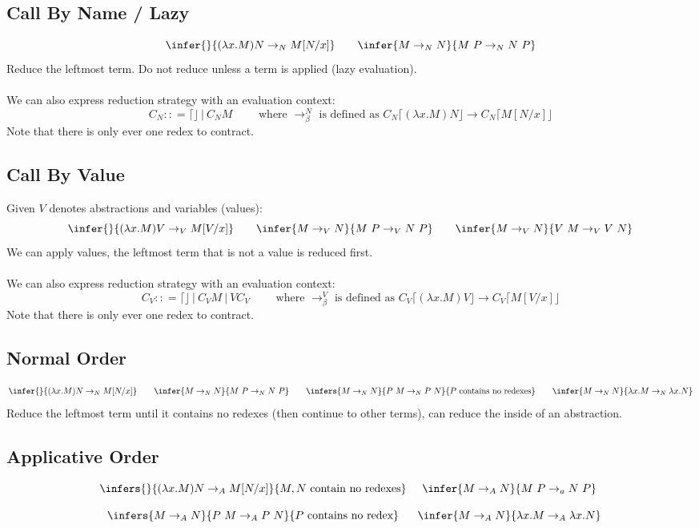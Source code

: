 \subsection{Call By Name / Lazy}
\[\infer{}{(\lambda x . M) N \to_N M[N / x]} \qquad \infer{M \to_N N}{M \ P \to_N N \ P}\]
Reduce the leftmost term. Do not reduce unless a term is applied (lazy evaluation).
\\
\\ We can also express reduction strategy with an evaluation context:
\[C_N :: = \lceil \rfloor \ | \ C_N M \qquad \text{ where } \to_\beta^N \text{ is defined as }C_N\lceil (\lambda x.M) N \rfloor \to C_N \lceil M[N/x] \rfloor\]
Note that there is only ever one redex to contract.

\subsection{Call By Value}
Given $V$ denotes abstractions and variables (values):
\[\infer{}{(\lambda x . M) V \to_V M[V/x]} \qquad \infer{M \to_V N}{M \ P \to_V N \ P} \qquad \infer{M \to_V N}{V \ M \to_V V \ N}\]
We can apply values, the leftmost term that is not a value is reduced first.
\\
\\ We can also express reduction strategy with an evaluation context:
\[C_V :: = \lceil \rfloor \ | \ C_V M \ | \ V C_V \qquad \text{ where } \to_\beta^V \text{ is defined as }C_V\lceil (\lambda x.M) V \rfloor \to C_V \lceil M[V/x] \rfloor\]
Note that there is only ever one redex to contract.

\subsection{Normal Order}
\[\infer{}{(\lambda x. M) N \to_N M[N/x]} \qquad  \infer{M \to_N N}{M \ P \to_N N \ P} \qquad  \infers{M \to_N N}{P \ M \to_N P \ N}{P\text{ contains no redexes}} \qquad \infer{M \to_N N}{\lambda x. M \to_N \lambda x . N}\]
Reduce the leftmost term until it contains no redexes (then continue to other terms), can reduce the inside of an abstraction.

\subsection{Applicative Order}
\[\begin{matrix}
    \infers{}{(\lambda x. M) N \to_A M[N/x]}{M, N\text{ contain no redexes}} & \infer{M \to_A N}{M \ P \to_a N \ P} \\
    \\
    \infers{M \to_A N}{P \ M \to_A P \ N}{P \text{ contains no redex}} & \infer{M \to_A N}{\lambda x. M \to_A \lambda x.N} \\
\end{matrix}\]

